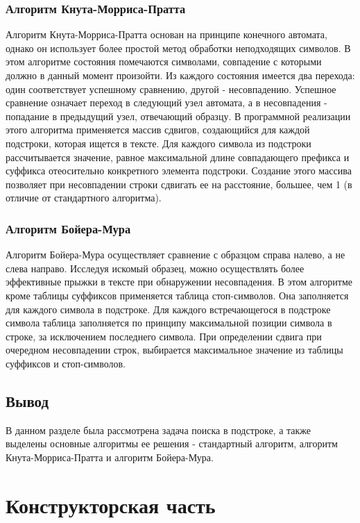 \documentclass[a4paper,12pt]{report}
\begin{document}
\subsection{Алгоритм Кнута-Морриса-Пратта}
\hspace{0.6cm}Алгоритм Кнута-Морриса-Пратта основан на принципе конечного автомата, однако он использует более простой метод обработки неподходящих символов. В этом алгоритме состояния помечаются символами, совпадение с которыми должно в данный момент произойти. Из каждого состояния имеется два перехода: один соответствует успешному сравнению, другой - несовпадению. Успешное сравнение означает переход в следующий узел автомата, а в несовпадения - попадание в предыдущий узел, отвечающий образцу. 
В программной реализации этого алгоритма применяется массив сдвигов, создающийся для каждой подстроки, которая ищется в тексте. Для каждого символа из подстроки рассчитывается значение, равное максимальной длине совпадающего префикса и суффикса отеосительно конкретного элемента подстроки. Создание этого массива позволяет при несовпадении строки сдвигать ее на расстояние, большее, чем 1 (в отличие от стандартного алгоритма).

\subsection{Алгоритм Бойера-Мура}
\hspace{0.6cm}Алгоритм Бойера-Мура осуществляет сравнение с образцом справа налево, а не слева направо. Исследуя искомый образец, можно осуществлять более эффективные прыжки в тексте при обнаружении несовпадения. В этом алгоритме кроме таблицы суффиксов применяется таблица стоп-символов. Она заполняется для каждого символа в подстроке. Для каждого встречающегося в подстроке символа таблица заполняется по принципу максимальной позиции символа в строке, за исключением последнего символа. При определении сдвига при очередном несовпадении строк, выбирается максимальное значение из таблицы суффиксов и стоп-символов.

\section*{Вывод}
В данном разделе была рассмотрена задача поиска в подстроке, а также выделены основные алгоритмы ее решения - стандартный алгоритм, алгоритм Кнута-Морриса-Пратта и алгоритм Бойера-Мура.

\chapter{Конструкторская часть}
\end{document}
